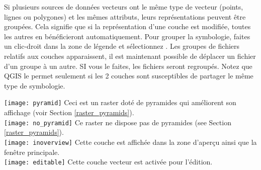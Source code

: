 

Si plusieurs sources de données vecteurs ont le même type de vecteur (points, lignes ou polygones) et les mêmes attributs, leurs représentations peuvent être groupées. Cela signifie que si la représentation d'une couche est modifiée, toutes les autres en bénéficieront automatiquement. Pour grouper la symbologie, faites un clic-droit dans la zone de légende et sélectionnez . Les groupes de fichiers relatifs aux couches apparaissent, il est maintenant possible de déplacer un fichier d'un groupe à un autre. SI vous le faites, les fichiers seront regroupés. Notez que QGIS le permet seulement si les 2 couches sont susceptibles de partager le même type de symbologie.


%

\texttt{[image: pyramid]} Ceci est un raster doté de pyramides qui améliorent son affichage (voir
Section \ref{raster_pyramids}).\\
\texttt{[image: no\_pyramid]} Ce raster ne dispose pas de pyramides (see Section \ref{raster_pyramids}).\\
\texttt{[image: inoverview]} Cette couche est affichée dans la zone d'aperçu ainsi que la fenêtre principale.\\
\texttt{[image: editable]} Cette couche vecteur est activée pour l'édition.\\

